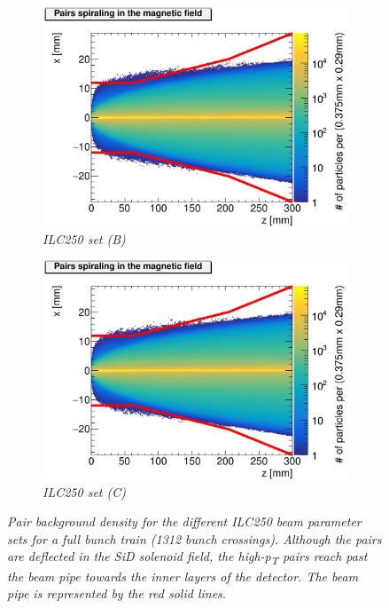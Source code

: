 \begin{figure}
\begin{subfigure}[t]{0.49\textwidth}
\includegraphics[width=\textwidth]{figures/Helix_tracks_xz_50bunches_250GeV_5T_Reduced_Emittance_x_Reduced_Beta_x-1.jpg}
\caption{\textit{ILC250 set (B)}}
\end{subfigure}
\hspace*{0.08cm}
\begin{subfigure}[t]{0.49\textwidth}
\centering
\includegraphics[width=\textwidth]{figures/Helix_tracks_xz_50bunches_250GeV_5T_Reduced_Emittance_x_Reduced_Beta_x_Increased_Beta_y-1.jpg}
\caption{\textit{ILC250 set (C)}}
\end{subfigure}
\caption{\textit{Pair background density for the different ILC250 beam parameter sets for a full bunch train (1312 bunch crossings). Although the pairs are deflected in the SiD solenoid field, the high-p\textsubscript{T} pairs reach past the beam pipe towards the inner layers of the detector. The beam pipe is represented by the red solid lines.}}
\label{fig:Envelopes}
\end{figure}

